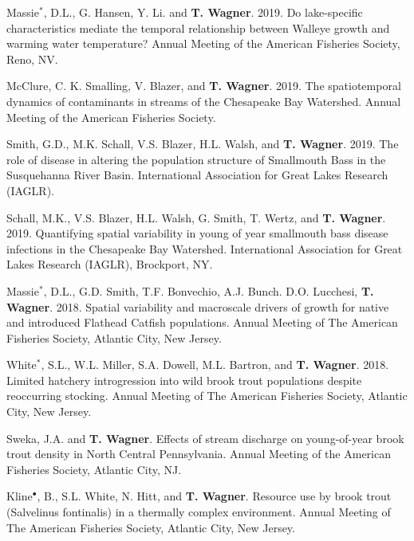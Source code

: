 \documentclass[10pt]{article}
\begin{document}
\begin{flushleft}
\begin{etaremune}
\item Massie$^*$, D.L., G. Hansen, Y. Li. and \textbf{T. Wagner}. 2019. Do lake-specific characteristics mediate the temporal relationship between Walleye growth and warming water temperature? Annual Meeting of the American Fisheries Society, Reno, NV.

\item McClure, C. K. Smalling, V. Blazer, and \textbf{T. Wagner}. 2019. The spatiotemporal dynamics of contaminants in streams of the Chesapeake Bay Watershed. Annual Meeting of the American Fisheries Society.

\item Smith, G.D., M.K. Schall, V.S. Blazer, H.L. Walsh, and \textbf{T. Wagner}. 2019. The role of disease in altering the population structure of Smallmouth Bass in the Susquehanna River Basin. International Association for Great Lakes Research (IAGLR). 

\item Schall, M.K., V.S. Blazer, H.L. Walsh, G. Smith, T. Wertz, and \textbf{T. Wagner}. 2019. Quantifying spatial variability in young of year smallmouth bass disease infections in the Chesapeake Bay Watershed. International Association for Great Lakes Research (IAGLR), Brockport, NY.

\item Massie$^*$, D.L., G.D. Smith, T.F. Bonvechio, A.J. Bunch. D.O. Lucchesi, {\bf T. Wagner}. 2018. Spatial variability and macroscale drivers of growth for native and introduced Flathead Catfish populations. Annual Meeting of The American Fisheries Society, Atlantic City, New Jersey.

\item White$^*$, S.L., W.L. Miller, S.A. Dowell, M.L. Bartron, and {\bf T. Wagner}. 2018. Limited hatchery introgression into wild brook trout populations despite reoccurring stocking. Annual Meeting of The American Fisheries Society, Atlantic City, New Jersey.

\item Sweka, J.A. and {\bf T. Wagner}. Effects of stream discharge on young-of-year brook trout density in North Central Pennsylvania. Annual Meeting of the American Fisheries Society, Atlantic City, NJ.

\item Kline$^\bullet$, B., S.L. White, N. Hitt, and {\bf T. Wagner}. Resource use by brook trout (Salvelinus fontinalis) in a thermally complex environment. Annual Meeting of The American Fisheries Society, Atlantic City, New Jersey.


\end{etaremune}
\end{flushleft}
\end{document}
